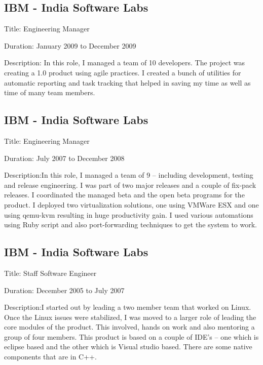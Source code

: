 \documentclass [a4paper,11pt] {article}
\begin{document}
\subsection*{IBM - India Software Labs}
\begin{description}
\item{Title:} Engineering Manager
\item{Duration:} January 2009 to December 2009
\item{Description:} In this role, I managed a team of 10 developers. The project was creating a 1.0 product using agile practices. I created a bunch of utilities for automatic reporting and task tracking that helped in saving my time as well as time of many team members.
\end{description}

\subsection*{IBM - India Software Labs}
\begin{description}
\item{Title:} Engineering Manager
\item{Duration:} July 2007 to December 2008
\item{Description:}In this role, I managed a team of 9 – including development, testing and release engineering. I was part of two major releases and a couple of fix-pack releases. I coordinated the managed beta and the open beta programs for the product. I deployed two virtualization solutions, one using VMWare ESX and one using qemu-kvm resulting in huge productivity gain. I used various automations using Ruby script and also port-forwarding techniques to get the system to work.
\end{description}

\subsection*{IBM - India Software Labs}
\begin{description}
\item{Title:} Staff Software Engineer
\item{Duration:} December 2005 to July 2007
\item{Description:}I started out by leading a two member team that worked on Linux. Once the Linux issues were stabilized, I was moved to a larger role of leading the core modules of the product. This involved, hands on work and also mentoring a group of four members. This product is based on a couple of IDE’s – one which is eclipse based and the other which is Visual studio based. There are some native components that are in C++.
\end{description}
\end{document}
